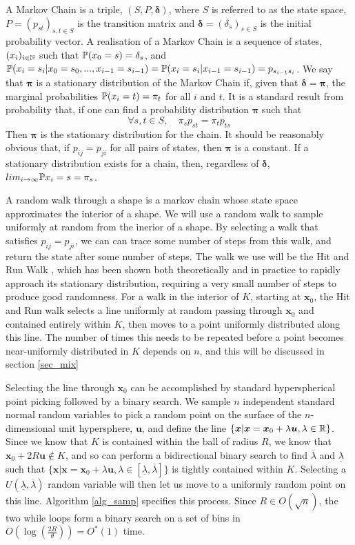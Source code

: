 A Markov Chain is a triple, $(S,P,\bm{\delta})$, where $S$ is referred to as the state space, $P = (p_{st})_{s,t \in S}$ is the transition matrix and $\bm{\delta} = (\delta_s)_{s \in S}$ is the initial probability vector. A realisation of a Markov Chain is a sequence of states, $(x_i)_{i \in \mathbb{N}}$ such that $\mathbb{P} (x_0 = s)=\delta_s$, and $\mathbb{P}(x_i = s_i | x_0 = s_0, ..., x_{i-1} = s_{i-1}) = \mathbb{P} (x_i = s_i | x_{i-1} = s_{i-1})= p_{s_{i-1}s_{i}}$. We say that $\bm{\pi}$ is a stationary distribution of the Markov Chain if, given that $\bm{\delta} = \bm{\pi}$, the marginal probabilities $\mathbb{P}(x_i = t) = \pi_t$ for all $i$ and $t$.  It is a standard result from probability that, if one can find a probability distribution $\bm{\pi}$ such that
$$
\forall s,t \in S, \quad \pi_s p_{st} = \pi_t p_{ts}
$$
Then $\bm{\pi}$ is the stationary distribution for the chain. It should be reasonably obvious that, if $p_{ij} = p_{ji}$ for all pairs of states, then $\bm{\pi}$ is a constant. If a stationary distribution exists for a chain, then, regardless of $\bm{\delta}$, $lim_{i-> \infty} \mathbb{P} {x_i = s} = \pi_s$.

A random walk through a shape is a markov chain whose state space approximates the interior of a shape. We will use a random walk to sample uniformly at random from the inerior of a shape. By selecting a walk that satisfies $p_{ij} = p_{ji}$, we can can trace some number of steps from this walk, and return the state after some number of steps. The walk we use will be the Hit and Run Walk \cite{Lovasz03a}, which has been shown both theoretically and in practice to rapidly approach its stationary distribution, requiring a very small number of steps to produce good randomness. For a walk in the interior of $K$, starting at $\bm{x}_0$, the Hit and Run walk selects a line uniformly at random passing through $\bm{x}_0$ and contained entirely within $K$, then moves to a point uniformly distributed along this line. The number of times this needs to be repeated before a point becomes near-uniformly distributed in $K$ depends on $n$, and this will be discussed in section \ref{sec_mix}

Selecting the line through $\bm{x}_0$ can be accomplished by standard hyperspherical point picking \cite{mathworld_picking} followed by a binary search. We sample $n$ independent standard normal random variables to pick a random point on the surface of the $n$-dimensional unit hypersphere, $\bm{u}$, and define the line $\{\bm{x} | \bm{x} = \bm{x}_0 + \lambda \bm{u}, \lambda \in \mathbb{R} \}$. Since we know that $K$ is contained within the ball of radius $R$, we know that $\bm{x}_0 + 2R\bm{u} \notin K$, and so can perform a bidirectional binary search to find $\overline{\lambda}$ and $\underline{\lambda}$ such that $\{\bm{x} | \bm{x} = \bm{x}_0 + \lambda \bm{u}, \lambda \in [\underline{\lambda}, \overline{\lambda}] \}$ is tightly contained within $K$. Selecting a $U(\underline{\lambda}, \overline{\lambda})$ random variable will then let us move to a uniformly random point on this line. Algorithm \ref{alg_samp} specifies this process. Since $R \in O(\sqrt{n})$, the two while loops form a binary search on a set of bins in $O(\log(\frac{2R}{\theta})) = O^{*}(1)$ time. 


